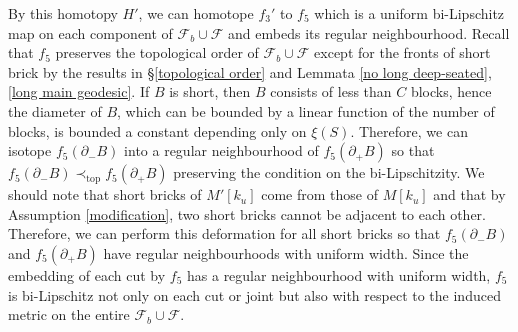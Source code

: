 \documentclass{amsart}
\newtheorem{lemma}[theorem]{Lemma}
\theoremstyle{definition}
\numberwithin{figure}{section}
\numberwithin{equation}{section}
\newcommand{\pretop}{\prec_\mathrm{top}}
\begin{document}

By this homotopy $H'$, we can homotope $f_3'$ to $f_5$ which  is a uniform bi-Lipschitz map on each component of $\mathcal{F}_b \cup \mathcal{F}$ and embeds  its regular neighbourhood.
Recall that $f_5$ preserves the topological order of $\mathcal F_b \cup \mathcal{F}$ except for the fronts of short brick by the results in \S \ref{topological order} and Lemmata \ref{no long deep-seated}, \ref{long main geodesic}.
If $B$ is short, then $B$ consists of less than $C$ blocks, hence the diameter of $B$, which can be bounded by a linear function of the number of blocks, is bounded a constant depending only on $\xi(S)$. 
Therefore,  we can isotope $f_5(\partial_- B)$ into a regular neighbourhood of $f_5(\partial_+B)$ so that $f_5(\partial_-B) \pretop f_5(\partial_+B)$ preserving the condition on the bi-Lipschitzity.
We should note that short bricks of $M'[k_u]$ come from those of $M[k_u]$ and that by Assumption \ref{modification}, two short bricks cannot be adjacent to each other.
Therefore, we can perform this deformation for all short bricks so that $f_5(\partial_-B)$ and $f_5(\partial_+B)$ have regular neighbourhoods with uniform width.
Since the embedding of each cut by $f_5$ has a regular neighbourhood with uniform width, $f_5$ is bi-Lipschitz not only on each cut or joint but also with respect to the induced metric on the entire $\mathcal F_b \cup \mathcal F$.
\end{document}
